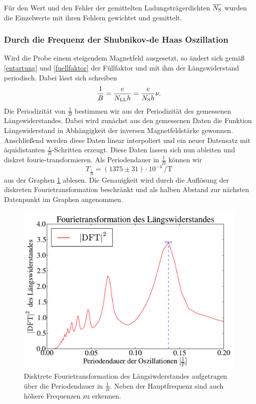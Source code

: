 \documentclass[paper=a4,fontsize=10pt,DIV=18,twocolumn,parskip=half]{scrartcl}
\numberwithin{equation}{section}    %
\newcommand{\kor}[1]{{\color{darkgreen}#1}}
\begin{document}
\kor{Für den Wert und den Fehler der gemittelten Ladungsträgerdichten $\overline{N_{\rm S}}$ wurden die Einzelwerte mit ihren Fehlern gewichtet und gemittelt.}\\

\subsubsection*{Durch die Frequenz der Shubnikov-de Haas Oszillation}
Wird die Probe einem steigendem Magnetfeld ausgesetzt, so ändert sich gemäß \eqref{entartung} und \eqref{fuellfaktor} der Füllfaktor und mit ihm der Längswiderstand periodisch. Dabei lässt sich schreiben
\begin{equation}
\frac{1}{B}=\frac{e}{N_{\rm LL} h}=\frac{e}{N_\mathrm{S} h} \nu.
\end{equation}
Die Periodizität von $\frac{1}{B}$ bestimmen wir aus der Periodizität des gemessenen Längswiderstandes. Dabei wird zunächst aus den gemessenen Daten die Funktion Längswiderstand in Abhängigkeit der inversen Magnetfeldstärke gewonnen. Anschließend werden diese Daten linear interpoliert und ein neuer Datensatz mit äquidistanten $\frac{1}{B}$-Schritten erzeugt. Diese Daten lassen sich nun ableiten und diskret fourie-transformieren. Als Periodendauer in $\frac{1}{B}$ können wir
\begin{equation}
T_{\frac{1}{B}}=(1375\pm 31) \cdot 10^{-4}\SI{}{\per\tesla}
\label{periodizitaet}
\end{equation}
aus der Graphen \ref{fft} ablesen. Die Genauigkeit wird durch die Auflösung der diskreten Fourietransformation beschränkt und als halben Abstand zur nächsten Datenpunkt im Graphen angenommen.

\begin{figure}[]
	\begin{center}
		\includegraphics[width=\columnwidth]{Data-Plots/06-Fourietransformation.pdf}
		\caption{Disktrete Fourietransformation des Längsiwderstandes aufgetragen über die Periodendauer in $\frac{1}{B}$. Neben der Hauptfrequenz sind auch höhere Frequenzen zu erkennen.}
		\label{fft}
	\end{center}
\end{figure}
\end{document}
